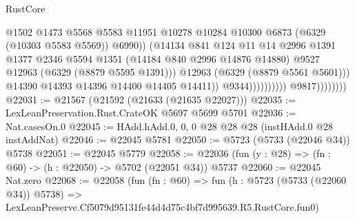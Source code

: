 \begin{lexlean}{RustCore}
\begin{coremodule}
                                                  @1502
                                                  @1473
                                                  @5568
                                                  @5583
                                                  @11951
                                                  @10278
                                                  @10284
                                                  @10300
                                                  @6873
                                                  (@6329 (@10303 @5583 @5569))
                                                  @6990))
                                              (@14134
                                                @841
                                                @124
                                                @11
                                                @14
                                                @2996
                                                @1391
                                                @1377
                                                @2346
                                                @5594
                                                @1351
                                                (@14184 @840 @2996 @14876 @14880)
                                                @9527
                                                @12963
                                                (@6329 (@8879 @5595 @1391)))
                                              @12963
                                              (@6329 (@8879 @5561 @5601)))
                                            @14390
                                            @14393
                                            @14396
                                            @14400
                                            @14405
                                            @14411))
                                        @9344))))))))))
                    @9817))))))))
@22031 := @21567 (@21592 (@21633 (@21635 @22027)))
@22035 := LexLeanPreservation.Rust.CrateOK @5697 @5699 @5701
@22036 := Nat.casesOn.{0}
@22045 := HAdd.hAdd.{0, 0, 0} @28 @28 @28 (instHAdd.{0} @28 instAddNat)
@22046 := @22045 @5781
@22050 := @5723 (@5733 (@22046 @34)) @5738
@22051 := @22045 @5779
@22058 := @22036 (fun (y : @28) => (fn : @60) -> (h : @22050) -> @5702 (@22051 @34)) @5737
@22060 := @22045 Nat.zero
@22068 := @22058
    (fun (fn : @60) =>
    fun (h : @5723 (@5733 (@22060 @34)) @5738) =>
    LexLeanPreserve.Cf5079d95131fe44d4d75c4bf7d995639.R5.RustCore.fun0)

\end{coremodule}
\end{lexlean}

